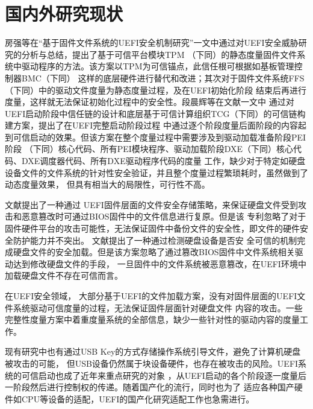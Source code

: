 \section{国内外研究现状}
房强等在“基于固件文件系统的UEFI安全机制研究”一文中通过对UEFI安全威胁研究的分析与总结\cite{chinese11}，提出了基于可信平台模块TPM
（下同）的静态度量固件文件系统中驱动程序的方法。该方案以TPM为可信锚点，此信任根可根据如基板管理控制器BMC（下同）
这样的底层硬件进行替代和改进；其次对于固件文件系统FFS（下同）中的驱动文件度量为静态度量过程，及在UEFI初始化阶段
结束后再进行度量，这样就无法保证初始化过程中的安全性。段晨辉等在文献一文中
通过对UEFI启动阶段中信任链的设计和底层基于可信计算组织TCG（下同）的可信链构建方案，提出了在UEFI完整启动阶段过程
中通过逐个阶段度量后面阶段的内容起到可信启动的效果。但该方案在整个度量过程中需要涉及到驱动加载准备阶段PEI阶段
（下同）核心代码、所有PEI模块程序、驱动加载阶段DXE（下同）核心代码、DXE调度器代码、所有DXE驱动程序代码的度量
工作，缺少对于特定如硬盘设备文件的文件系统的针对性安全验证，并且整个度量过程繁琐耗时，虽然做到了动态度量效果，
但具有相当大的局限性，可行性不高。
\par 文献提出了一种通过
UEFI固件层面的文件安全存储策略，来保证硬盘文件受到攻击和恶意篡改时可通过BIOS固件中的文件信息进行复原。但是该
专利忽略了对于固件硬件平台的攻击可能性，无法保证固件中备份文件的安全性，即文件的硬件安全防护能力并不突出。
文献提出了一种通过检测硬盘设备是否安
全可信的机制完成硬盘文件的安全加载。但是该方案忽略了通过篡改BIOS固件中文件系统相关驱动达到修改硬盘文件的手段，
一旦固件中的文件系统被恶意篡改，在UEFI环境中加载硬盘文件不存在可信而言。
\par 在UEFI安全领域\cite{english9}，
大部分基于UEFI的文件加载方案，没有对固件层面的UEFI文件系统驱动可信度量的过程，无法保证固件层面针对硬盘文件
内容的攻击\cite{english10,english11}。一些完整性度量方案中着重度量系统的全部信息，缺少一些针对性的驱动内容的度量工作\cite{english4}。
\par 现有研究中也有通过USB Key的方式存储操作系统引导文件\cite{english15}，避免了计算机硬盘被攻击的可能，
但USB设备仍然属于块设备硬件，也存在被攻击的风险。UEFI系统的可信启动也成了近年来重点研究的对象\cite{english8,english14}
，从UEFI启动的各个阶段逐一度量后一阶段然后进行控制权的传递。随着国产化的流行\cite{english19}，同时也为了
适应各种国产硬件如CPU等设备的适配，UEFI的国产化研究适配工作也急需进行。

%
%
